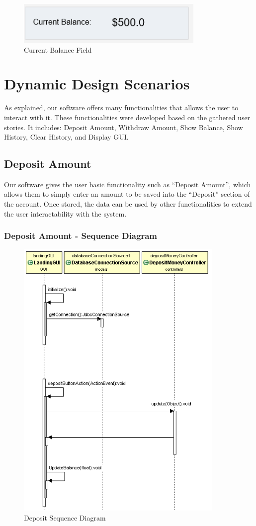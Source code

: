 \documentclass[12pt]{article}
\begin{document}
\begin{figure}[h!]
  \centering
  \includegraphics[]{current_balance.png}
  \caption{Current Balance Field}
\end{figure}


\section{Dynamic Design Scenarios}
As explained, our software offers many functionalities that allows the user to interact with it. These functionalities were developed based on the gathered user stories. It includes: Deposit Amount, Withdraw Amount, Show Balance, Show History, Clear History, and Display GUI. 

\subsection{Deposit Amount}
Our software gives the user basic functionality such as “Deposit Amount”, which allows them to simply enter an amount to be saved into the “Deposit” section of the account. Once stored, the data can be used by other functionalities to extend the user interactability with the system.

\subsubsection{Deposit Amount - Sequence Diagram}

\begin{figure}[h!]
  \centering
  \includegraphics[width=100mm]{deposit_sequence.png}
  \caption{Deposit Sequence Diagram}
\end{figure}
\end{document}
